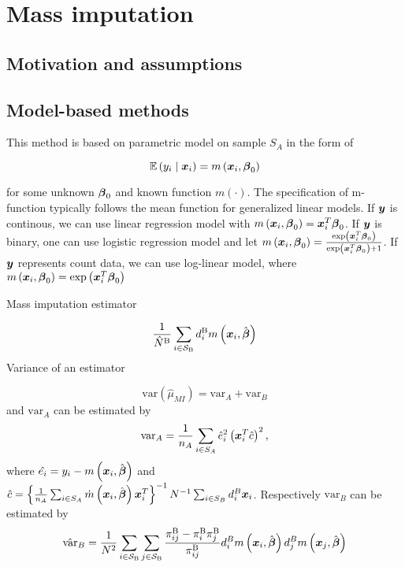 \documentclass[
  letterpaper,
  DIV=11,
  numbers=noendperiod]{scrreprt}
\begin{document}

\hypertarget{mass-imputation}{%
\chapter{Mass imputation}\label{mass-imputation}}

\hypertarget{motivation-and-assumptions-1}{%
\section{Motivation and
assumptions}\label{motivation-and-assumptions-1}}

\hypertarget{model-based-methods}{%
\section{Model-based methods}\label{model-based-methods}}

This method is based on parametric model on sample \(S_A\) in the form
of

\[
\begin{equation}
\mathbb{E}\left(y_i \mid \bx_i\right) = m\left(\bx_i, \bbeta_{0}\right)
\end{equation}
\]

for some unknown \(\boldsymbol{\beta}_{0}\) and known function \(m(\cdot)\). The
specification of m-function typically follows the mean function for
generalized linear models. If \(\boldsymbol{y}\) is continous, we can use linear
regression model with
\(m\left(\boldsymbol{x}_i, \boldsymbol{\beta}_{0}\right) = \boldsymbol{x}_i^{T} \boldsymbol{\beta}_0\). If
\(\boldsymbol{y}\) is binary, one can use logistic regression model and let
\(m\left(\boldsymbol{x}_i, \boldsymbol{\beta}_{0}\right) = \frac{\exp\left( \boldsymbol{x}_i^{T} \boldsymbol{\beta}_0\right)}{\exp\left( \boldsymbol{x}_i^{T} \boldsymbol{\beta}_0\right) + 1}\).
If \(\boldsymbol{y}\) represents count data, we can use log-linear model, where
\(m\left(\boldsymbol{x}_i, \boldsymbol{\beta}_{0}\right) = \exp\left(\boldsymbol{x}_i^{T} \boldsymbol{\beta}_0\right)\)

Mass imputation estimator

\[
\begin{equation}
\frac{1}{\hat{N}^{\mathrm{B}}} \sum_{i \in \mathcal{S}_{\mathrm{B}}} d_i^{\mathrm{B}} m\left(\boldsymbol{x}_i, \hat{\bbeta}\right)
\end{equation}
\] Variance of an estimator

\[
\text{var}\left(\hat{\mu}_{MI}\right) = \text{var}_A + \text{var}_B 
\] and \(\text{var}_A\) can be estimated by \[
\text{var}_A = \frac{1}{n_A} \sum_{i \in S_A} \hat{e}_i^2 \left(\boldsymbol{x}_i^{T} \hat{c}\right)^2,
\] where
\(\hat{e_i} = y_i - m\left(\boldsymbol{x}_i, \hat{\boldsymbol{\beta}}\right)\) and
\(\hat{c} = \left\{\frac{1}{n_A} \sum_{i \in S_A} \dot{m}\left(\boldsymbol{x}_i, \hat{\boldsymbol{\beta}}\right) \boldsymbol{x}_i^T \right\}^{-1} N^{-1} \sum_{i \in S_B} d_i^B \boldsymbol{x}_i\).
Respectively \(\text{var}_B\) can be estimated by \[
\hat{\text{var}}_B = \frac{1}{N^2} \sum_{i \in \mathcal{S}_{\mathrm{B}}} \sum_{j \in \mathcal{S}_{\mathrm{B}}} \frac{\pi_{i j}^{\mathrm{B}}-\pi_i^{\mathrm{B}} \pi_j^{\mathrm{B}}}{\pi_{i j}^{\mathrm{B}}} d_i^B m\left(\boldsymbol{x}_i, \hat{\boldsymbol{\beta}}\right) d_j^B m\left(\boldsymbol{x}_j, \hat{\boldsymbol{\beta}}\right)
\]
\end{document}
